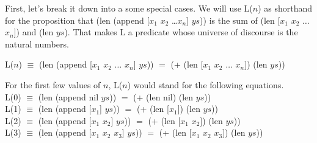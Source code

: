 First, let's break it down into a some special cases.
We will use L($n$) as shorthand for the proposition that
\textsf{(len (append [$x_1$ $x_2$ \dots $x_n$] $ys$))}
is the sum of \textsf{(len [$x_1$ $x_2$ $\dots$ $x_n$])} and \textsf{(len $ys$)}.
That makes L a predicate whose universe of discourse is
the natural numbers.
\label{additive-concat-law-predicate}
\begin{center}
L($n$) $\equiv$ \textsf{(len (append [$x_1$ $x_2$ $\dots$ $x_n$] $ys$))} $=$
\textsf{(+ (len [$x_1$ $x_2$ $\dots$ $x_n$]) (len $ys$))}
\end{center}

For the first few values of $n$, L($n$) would stand for the following equations.\\
\hspace*{1cm}L(0) $\equiv$ \textsf{(len (append nil $ys$))} $=$ \textsf{(+ (len nil) (len $ys$))} \\
\hspace*{1cm}L(1) $\equiv$ \textsf{(len (append [$x_1$] $ys$))} $=$ \textsf{(+ (len [$x_1$]) (len $ys$))} \\
\hspace*{1cm}L(2) $\equiv$ \textsf{(len (append [$x_1$ $x_2$] $ys$))} $=$ \textsf{(+ (len [$x_1$ $x_2$]) (len $ys$))} \\
\hspace*{1cm}L(3) $\equiv$ \textsf{(len (append [$x_1$ $x_2$ $x_3$] $ys$))} $=$ \textsf{(+ (len [$x_1$ $x_2$ $x_3$]) (len $ys$))} \\

